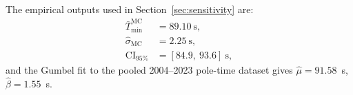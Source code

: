 \documentclass[11pt,twocolumn]{article}
\theoremstyle{definition}
\theoremstyle{remark}
\begin{document}
The empirical outputs used in Section~\ref{sec:sensitivity} are:
\begin{align*}
  \bar T_{\min}^{\mathrm{MC}} &= 89.10~\mathrm{s},\\
  \hat\sigma_{\mathrm{MC}} &= 2.25~\mathrm{s},\\
  \mathrm{CI}_{95\%} &= [84.9,\ 93.6]~\mathrm{s},
\end{align*}
and the Gumbel fit to the pooled 2004--2023 pole-time dataset gives
$\hat\mu = 91.58$~s, $\hat\beta = 1.55$~s.



\end{document}
